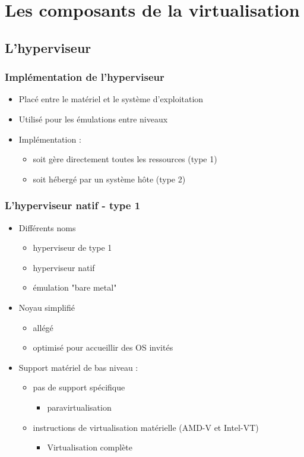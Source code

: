 \section{Les composants de la virtualisation}
\subsection{L'hyperviseur}

\begin{frame}
\frametitle{Implémentation de l'hyperviseur}
\begin{itemize}
\item Placé entre le matériel et le système d'exploitation
\item Utilisé pour les émulations entre niveaux
\item Implémentation :
\begin{itemize}
\item soit gère directement toutes les ressources (type 1)
\item soit hébergé par un système hôte (type 2)
\end{itemize}
\end{itemize}
\end{frame}

\begin{frame}
\frametitle{L'hyperviseur natif - type 1}
\begin{itemize}
\item Différents noms
\begin{itemize}
  \item hyperviseur de type 1
  \item hyperviseur natif
  \item émulation "bare metal"
\end{itemize}
\item Noyau simplifié
\begin{itemize}
\item allégé
\item optimisé pour accueillir des OS invités
\end{itemize}
\item Support matériel de bas niveau :
\begin{itemize}
\item pas de support spécifique
\begin{itemize}
\item paravirtualisation
\end{itemize}
\item instructions de virtualisation matérielle (AMD-V et Intel-VT)
\begin{itemize}
\item Virtualisation complète
\end{itemize}
\end{itemize}
\end{itemize}
\end{frame}




